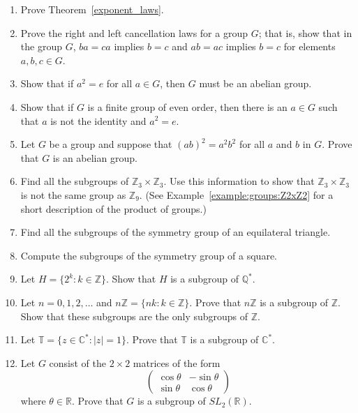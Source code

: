 {\begin{enumerate}
\item
Prove Theorem~\ref{exponent_laws}.
 
 
\item
Prove the right and left cancellation laws for a group $G$; that is,
show that in the group $G$, $ba = ca$ implies $b = c$ and $ab = ac$
implies $b = c$ for elements $a, b, c \in G$.  
 
\item
Show that if $a^2 = e$ for all $a \in G$, then $G$ must be an abelian
group. 
 
 
\item
Show that if $G$ is a finite group of even order, then there is an $a
\in G$ such that $a$ is not the identity and $a^2 = e$.
 
 
\item
Let $G$ be a group and suppose that $(ab)^2 = a^2b^2$ for all $a$ and
$b$ in $G$.  Prove that $G$ is an abelian group. 
 
 
\item
Find all the subgroups of ${\mathbb Z}_3 \times {\mathbb Z}_3$. Use this
information to show that ${\mathbb Z}_3 \times {\mathbb Z}_3$ is not the
same group as ${\mathbb Z}_9$.  (See Example~\ref{example:groups:Z2xZ2}
for a short description of the product of groups.)
 
 
\item
Find all the subgroups of the symmetry group of an equilateral
triangle. 
 
 
\item
Compute the subgroups of the symmetry group of a square.
 
 
\item
Let $H = \{2^k : k \in {\mathbb Z} \}$. Show that $H$ is a subgroup of
${\mathbb Q}^*$. 
 
 
\item
Let $n = 0, 1, 2, \ldots$ and $n {\mathbb Z} = \{ nk : k \in  {\mathbb Z}
\}$. Prove that $n {\mathbb Z}$ is a subgroup of ${\mathbb Z}$.  Show that
these subgroups are the only subgroups of $\mathbb{Z}$.
 
 
\item
Let ${\mathbb T} = \{ z \in  {\mathbb C}^* : |z| =1 \}$. Prove that ${\mathbb
T}$ is a subgroup of ${\mathbb C}^*$. 
 
 
\item
Let $G$ consist of the $2 \times 2$ matrices of the form
\[
\begin{pmatrix}
\cos \theta & -\sin \theta \\
\sin \theta & \cos \theta
\end{pmatrix}
\]
where $\theta \in {\mathbb R}$. Prove that $G$ is a subgroup of $SL_2(
{\mathbb R})$. 
 

\end{enumerate}}
